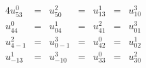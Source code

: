 \begin{alignat*}{4} 
	u_{53}^0 & {}={} & u_{50}^2 & {}={} & u_{13}^1 & {}={} & u_{10}^3\\
	u_{44}^0 & {}={} & u_{04}^1 & {}={} & u_{41}^2 & {}={} & u_{01}^3\\
	u_{4-1}^2 & {}={} & u_{0-1}^3 & {}={} & u_{42}^0 & {}={} & u_{02}^1\\
	u_{-13}^1 & {}={} & u_{-10}^3 & {}={} & u_{33}^0 & {}={} & u_{30}^2
\end{alignat*}